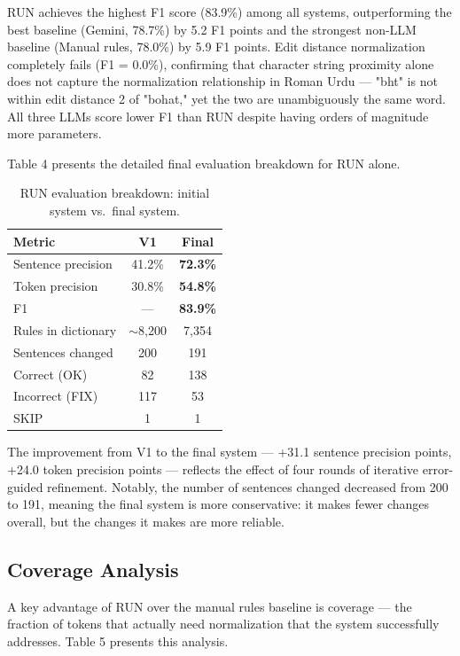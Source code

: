 \documentclass[11pt]{article}
\begin{document}
RUN achieves the highest F1 score (83.9\%) among all systems, outperforming the best baseline (Gemini, 78.7\%) by 5.2 F1 points and the strongest non-LLM baseline (Manual rules, 78.0\%) by 5.9 F1 points. Edit distance normalization completely fails (F1 = 0.0\%), confirming that character string proximity alone does not capture the normalization relationship in Roman Urdu — "bht" is not within edit distance 2 of "bohat," yet the two are unambiguously the same word. All three LLMs score lower F1 than RUN despite having orders of magnitude more parameters.

Table 4 presents the detailed final evaluation breakdown for RUN alone.


\begin{table}[!ht]
\centering
\small
\begin{tabular}{lcc}
\toprule
\textbf{Metric} & \textbf{V1} & \textbf{Final} \\
\midrule
Sentence precision  & 41.2\% & \textbf{72.3\%} \\
Token precision     & 30.8\% & \textbf{54.8\%} \\
F1                  & ---    & \textbf{83.9\%} \\
Rules in dictionary & $\sim$8,200 & 7,354 \\
Sentences changed   & 200    & 191   \\
Correct (OK)        & 82     & 138   \\
Incorrect (FIX)     & 117    & 53    \\
SKIP                & 1      & 1     \\
\bottomrule
\end{tabular}
\caption{RUN evaluation breakdown: initial system vs.\ final system.}
\label{tab:run-breakdown}
\end{table}

The improvement from V1 to the final system — +31.1 sentence precision points, +24.0 token precision points — reflects the effect of four rounds of iterative error-guided refinement. Notably, the number of sentences changed decreased from 200 to 191, meaning the final system is more conservative: it makes fewer changes overall, but the changes it makes are more reliable.

\subsection{Coverage Analysis}
A key advantage of RUN over the manual rules baseline is coverage — the fraction of tokens that actually need normalization that the system successfully addresses. Table 5 presents this analysis.
\end{document}

